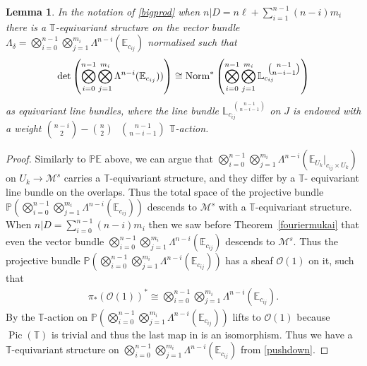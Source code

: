 \documentclass[12pt]{article}
\numberwithin{equation}{section}
\newtheorem{lemma}[theorem]{Lemma}
\theoremstyle{remark}
\theoremstyle{definition}
\numberwithin{theorem}{section}
\def\beq{\begin{eqnarray}}
\def\eeq{\end{eqnarray}}
\def\Nm{{\rm Norm}}
\DeclareMathOperator{\Pic}{Pic}
\def\bE{{\mathbb{E}}}
\def\L{\mathbb{L}}
\def\M{{\mathcal{M}}}
\def\P{\mathbb{P}}
\newcommand{\T}{{\mathbb{T}}}
\def\calO{{\mathcal O}}
\newcommand{\bino}[2]{\mbox{ $\binom{#1}{#2}$}}
\def\d{{{\delta}}}
\renewcommand{\1}{\mathbbm{1}}
\begin{document}
\begin{lemma} In the notation of \eqref{bigprod} when $n|D=n\ell+\sum_{i=1}^{n-1}(n-i)m_i$ there is a $\T$-equivariant structure on the vector bundle $\Lambda_\d=\bigotimes_{i=0}^{n-1}\bigotimes_{j=1}^{m_i} \Lambda^{n-i}(\bE_{c_{ij}})$ normalised such that 
	\beq\label{equinormalise} \det\left(\bigotimes_{i=0}^{n-1}\bigotimes_{j=1}^{m_i} \Lambda^{n-i}(\bE_{c_{ij}}))\right)\cong \Nm^*\left(\bigotimes_{i=0}^{n-1}\bigotimes_{j=1}^{m_i} \L_{c_{ij}}^{\bino{n-1}{n-i-1}}\right)\eeq as equivariant line bundles, where the line bundle $\L_{c_{ij}}^{\bino{n-1}{n-i-1}}$ on $J$ is endowed with a weight ${n-i\choose 2}-{n\choose 2}{\bino{n-1}{n-i-1}}$ $\T$-action.
\end{lemma}

\begin{proof}
	Similarly to $\P\bE$ above,  we can argue that $\bigotimes_{i=0}^{n-1}\bigotimes_{j=1}^{m_i} \Lambda^{n-i}(\bE_{U_k}|_{c_{ij}\times U_k})$ on $U_k\to \M^s$  carries a $\T$-equivariant structure, and they differ by a $\T$- equivariant line bundle on the overlaps. Thus the total space of the projective bundle $\P\left(\bigotimes_{i=0}^{n-1}\bigotimes_{j=1}^{m_i} \Lambda^{n-i}(\bE_{c_{ij}})\right)$ descends to $\M^s$ with a $\T$-equivariant structure.  When $n|D=\sum_{i=0}^{n-1}(n-i)m_i$ then we saw before Theorem~\ref{fouriermukai} that even the vector bundle $\bigotimes_{i=0}^{n-1}\bigotimes_{j=1}^{m_i} \Lambda^{n-i}(\bE_{c_{ij}})$ descends to $\M^s$. Thus the projective bundle $\P\left(\bigotimes_{i=0}^{n-1}\bigotimes_{j=1}^{m_i} \Lambda^{n-i}(\bE_{c_{ij}})\right)$ has a sheaf $\calO(1)$ on it, such that \beq \label{pushdown} \pi_*(\calO(1))^*\cong \bigotimes_{i=0}^{n-1}\bigotimes_{j=1}^{m_i} \Lambda^{n-i}(\bE_{c_{ij}}).\eeq By \cite[Theorem 4.2.2]{brion} the $\T$-action on  $\P\left(\bigotimes_{i=0}^{n-1}\bigotimes_{j=1}^{m_i} \Lambda^{n-i}(\bE_{c_{ij}})\right)$ lifts to $\calO(1)$ because $\Pic(\T)$ is trivial and thus the last map in \cite[(12)]{brion} is an isomorphism. Thus we have a $\T$-equivariant structure on $\bigotimes_{i=0}^{n-1}\bigotimes_{j=1}^{m_i} \Lambda^{n-i}(\bE_{c_{ij}})$ from \eqref{pushdown}. 
	

\end{proof}
\end{document}
